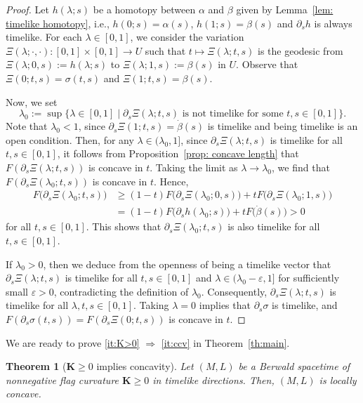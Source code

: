 \documentclass[a4paper,11pt]{article}
\numberwithin{equation}{section}
\theoremstyle{definition}
\theoremstyle{plain}
\newtheorem{theorem}[definition]{Theorem}
\providecommand{\todo}[1]{\P \textbf{#1} \P}
\newcommand{\del}{\partial}
\newcommand{\lra}{\longrightarrow}
\newcommand{\ve}{\varepsilon}
\newcommand{\bK}{\mathbf{K}}
\begin{document}
\begin{proof}
Let $h(\lambda;s)$ be a homotopy between $\alpha$ and $\beta$ given by Lemma~\ref{lem: timelike homotopy}, i.e.,
$h(0;s)=\alpha(s)$, $h(1;s)=\beta(s)$ and $\partial_s h$ is always timelike.
For each $\lambda \in [0,1]$, we consider the variation $\Xi(\lambda;\cdot,\cdot) \colon [0,1] \times [0,1] \lra U$ such that $t \longmapsto \Xi(\lambda;t,s)$ is the geodesic from $\Xi(\lambda;0,s):=h(\lambda;s)$ to $\Xi(\lambda;1,s):=\beta(s)$ in $U$.
Observe that $\Xi(0;t,s)=\sigma(t,s)$ and $\Xi(1;t,s)= \beta(s)$.

Now, we set
\[ \lambda_0:=\sup\bigl\{ \lambda \in [0,1] \mid \del_s \Xi(\lambda;t,s) \text{ is not timelike for some } t,s \in [0,1] \bigr\}. \]
Note that $\lambda_0 < 1$, since $\partial_s\Xi(1;t,s)=\dot\beta(s)$ is timelike and being timelike is an open condition.
%
Then, for any $\lambda \in (\lambda_0,1]$, since $\del_s \Xi(\lambda;t,s)$ is timelike for all $t,s \in [0,1]$, it follows from Proposition~\ref{prop: concave length} that
$F(\del_s \Xi(\lambda;t,s))$ is concave in $t$.
Taking the limit as $\lambda \to \lambda_0$, we find that $F(\del_s \Xi(\lambda_0;t,s))$ is concave in $t$.
Hence,
\begin{align*}
F\bigl( \del_s \Xi(\lambda_0;t,s) \bigr)
&\ge (1-t)F\bigl( \del_s \Xi(\lambda_0;0,s) \bigr) +tF\bigl( \del_s \Xi(\lambda_0;1,s)\bigr) \\
&= (1-t)F\bigl( \del_s h(\lambda_0;s)\bigr) +tF\bigl( \dot{\beta}(s) \bigr) >0
\end{align*}
for all $t,s \in [0,1]$.
This shows that $\partial_s\Xi(\lambda_0;t,s)$ is also timelike for all $t,s \in [0,1]$.

If $\lambda_0>0$, then we deduce from the openness of being a timelike vector that $\partial_s\Xi(\lambda;t,s)$ is timelike for all $t,s \in [0,1]$ and $\lambda \in (\lambda_0-\ve,1]$ for sufficiently small $\ve>0$, contradicting the definition of $\lambda_0$.
Consequently, $\partial_s\Xi(\lambda;t,s)$ is timelike for all $\lambda,t,s \in [0,1]$.
Taking $\lambda=0$ implies that $\del_s \sigma$ is timelike, and $F(\del_s \sigma(t,s))=F(\del_s \Xi(0;t,s))$ is concave in $t$. 
\end{proof}

We are ready to prove \eqref{it:K>0} $\Rightarrow$ \eqref{it:ccv} in Theorem~\ref{th:main}.

\begin{theorem}[$\bK \ge 0$ implies concavity]
\label{th:Bconc}
Let $(M,L)$ be a Berwald spacetime of nonnegative flag curvature $\bK \ge 0$ in timelike directions.
Then, $(M,L)$ is locally concave.
\end{theorem}
\end{document}
